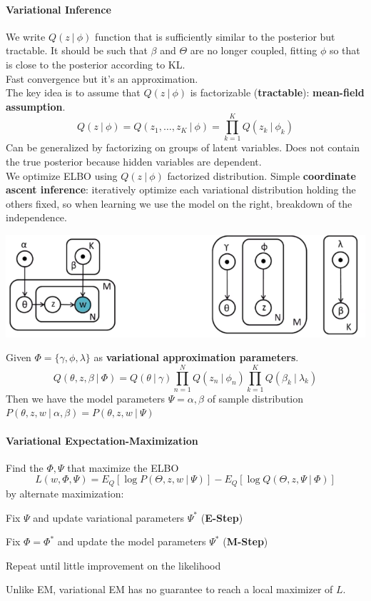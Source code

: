 \documentclass[10pt]{report}
\begin{document}
\paragraph{Variational Inference} We write $Q(z\:|\:\phi)$ function that is sufficiently similar to the posterior but tractable. It should be such that $\beta$ and $\Theta$ are no longer coupled, fitting $\phi$ so that is close to the posterior according to KL.\\
Fast convergence but it's an approximation.\\
The key idea is to assume that $Q(z\:|\:\phi)$ is factorizable (\textbf{tractable}): \textbf{mean-field assumption}.
$$Q(z\:|\:\phi) = Q(z_1,\ldots,z_K\:|\:\phi)=\prod_{k=1}^K Q(z_k\:|\:\phi_k)$$
Can be generalized by factorizing on groups of latent variables. Does not contain the true posterior because hidden variables are dependent.\\
We optimize ELBO using $Q(z\:|\:\phi)$ factorized distribution. Simple \textbf{coordinate ascent inference}: iteratively optimize each variational distribution holding the others fixed, so when learning we use the model on the right, breakdown of the independence.
\begin{center}
	\includegraphics[scale=0.5]{42.png}
\end{center}
Given $\Phi=\{\gamma,\phi,\lambda\}$ as \textbf{variational approximation parameters}.
$$Q(\theta,z,\beta\:|\:\Phi) = Q(\theta\:|\:\gamma)\prod_{n=1}^NQ(z_n\:|\:\phi_n)\prod_{k=1}^KQ(\beta_k\:|\:\lambda_k)$$
Then we have the model parameters $\Psi=\alpha,\beta$ of sample distribution $P(\theta,z,w\:|\:\alpha,\beta)=P(\theta,z,w\:|\:\Psi)$
\paragraph{Variational Expectation-Maximization} Find the $\Phi, \Psi$ that maximize the ELBO
$$L(w,\Phi,\Psi) = E_Q[\log P(\Theta,z,w\:|\:\Psi)] - E_Q[\log Q(\Theta,z,\Psi\:|\:\Phi)]$$
by alternate maximization:
\begin{list}{}{}
	\item Fix $\Psi$ and update variational parameters $\Psi^*$ (\textbf{E-Step})
	\item Fix $\Phi = \Phi^*$ and update the model parameters $\Psi^*$ (\textbf{M-Step})
	\item Repeat until little improvement on the likelihood
\end{list}
Unlike EM, variational EM has no guarantee to reach a local maximizer of $L$.
\end{document}
